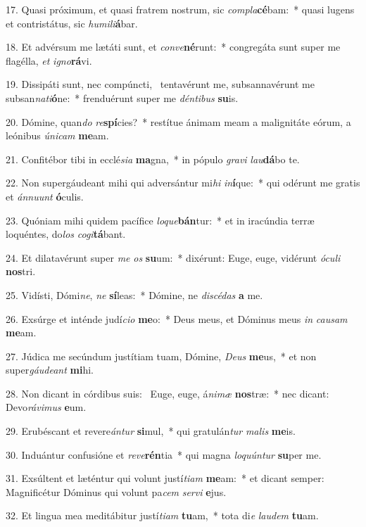 17. Quasi próximum, et quasi fratrem nostrum, sic \textit{com}\textit{pla}\textbf{cé}bam:~*  quasi lugens et contristátus, sic \textit{hu}\textit{mi}\textit{li}\textbf{á}bar.\

18. Et advérsum me lætáti sunt, et \textit{con}\textit{ve}\textbf{né}runt:~*  congregáta sunt super me flagélla, \textit{et} \textit{i}\textit{gno}\textbf{rá}vi.\

19. Dissipáti sunt, nec compúncti, \dag\  tentavérunt me, subsannavérunt me subsan\textit{na}\textit{ti}\textbf{ó}ne:~*  frenduérunt super me \textit{dén}\textit{ti}\textit{bus} \textbf{su}is.\

20. Dómine, quan\textit{do} \textit{re}\textbf{spí}cies?~*  restítue ánimam meam a malignitáte eórum, a leónibus \textit{ú}\textit{ni}\textit{cam} \textbf{me}am.\

21. Confitébor tibi in ecclé\textit{si}\textit{a} \textbf{ma}gna,~*  in pópulo \textit{gra}\textit{vi} \textit{lau}\textbf{dá}bo te.\

22. Non supergáudeant mihi qui adversántur mi\textit{hi} \textit{in}\textbf{í}que:~*  qui odérunt me gratis et \textit{án}\textit{nu}\textit{unt} \textbf{ó}culis.\

23. Quóniam mihi quidem pacífice \textit{lo}\textit{que}\textbf{bán}tur:~*  et in iracúndia terræ loquéntes, do\textit{los} \textit{co}\textit{gi}\textbf{tá}bant.\

24. Et dilatavérunt super \textit{me} \textit{os} \textbf{su}um:~*  dixérunt: Euge, euge, vidérunt \textit{ó}\textit{cu}\textit{li} \textbf{nos}tri.\

25. Vidísti, Dómi\textit{ne}, \textit{ne} \textbf{sí}leas:~*  Dómine, ne \textit{di}\textit{scé}\textit{das} \textbf{a} me.\

26. Exsúrge et inténde judí\textit{ci}\textit{o} \textbf{me}o:~*  Deus meus, et Dóminus meus \textit{in} \textit{cau}\textit{sam} \textbf{me}am.\

27. Júdica me secúndum justítiam tuam, Dómine, \textit{De}\textit{us} \textbf{me}us,~*  et non super\textit{gáu}\textit{de}\textit{ant} \textbf{mi}hi.\

28. Non dicant in córdibus suis: \dag\  Euge, euge, á\textit{ni}\textit{mæ} \textbf{nos}træ:~*  nec dicant: Devo\textit{rá}\textit{vi}\textit{mus} \textbf{e}um.\

29. Erubéscant et revere\textit{án}\textit{tur} \textbf{si}mul,~*  qui gratulán\textit{tur} \textit{ma}\textit{lis} \textbf{me}is.\

30. Induántur confusióne et \textit{re}\textit{ve}\textbf{rén}tia~*  qui magna \textit{lo}\textit{quún}\textit{tur} \textbf{su}per me.\

31. Exsúltent et læténtur qui volunt justí\textit{ti}\textit{am} \textbf{me}am:~*  et dicant semper: Magnificétur Dóminus qui volunt pa\textit{cem} \textit{ser}\textit{vi} \textbf{e}jus.\

32. Et lingua mea meditábitur justí\textit{ti}\textit{am} \textbf{tu}am,~*  tota di\textit{e} \textit{lau}\textit{dem} \textbf{tu}am.\

